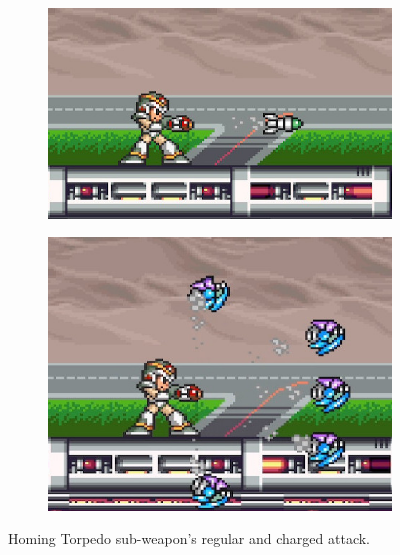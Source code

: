 \begin{figure}[htp]
	\centering
	\begin{subfigure}{0.39\linewidth}
		\includegraphics[width=\linewidth]{figures/X1/weapons/Homing_torpedo_1.jpg}	
	\end{subfigure}
		\begin{subfigure}{0.3\linewidth}
		\includegraphics[width=\linewidth]{figures/X1/weapons/Homing_torpedo_2.jpg}	
	\end{subfigure}
	\caption{Homing Torpedo sub-weapon's regular and charged attack.}
\end{figure}

